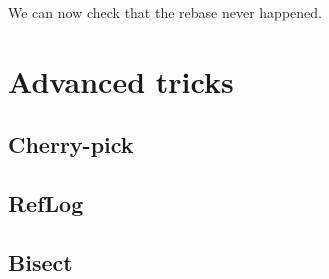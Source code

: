 \documentclass{article}
\begin{document}
We can now check that the rebase never happened.

\section{Advanced tricks}

\subsection{Cherry-pick}

\subsection{RefLog}

\subsection{Bisect}

\subsection{}
\end{document}
